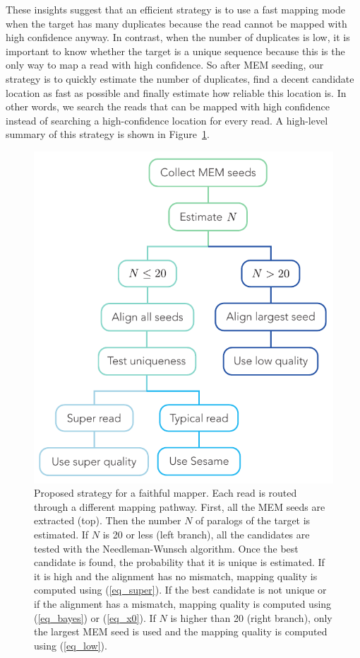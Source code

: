 \documentclass[a4,center,fleqn]{NAR}
\begin{document}
These insights suggest that an efficient strategy is to use a fast mapping
mode when the target has many duplicates because the read cannot be mapped
with high confidence anyway. In contrast, when the number of duplicates is
low, it is important to know whether the target is a unique sequence
because this is the only way to map a read with high confidence. So after
MEM seeding, our strategy is to quickly estimate the number of duplicates,
find a decent candidate location as fast as possible and finally estimate
how reliable this location is. In other words, we search the reads that
can be mapped with high confidence instead of searching a high-confidence
location for every read. A high-level summary of this strategy is shown in
Figure~\ref{fig_tree}.

\begin{figure}[t]
\begin{center}
\includegraphics[scale=.8]{decision_tree.pdf}
\end{center}
\caption{Proposed strategy for a faithful mapper. Each read is routed
through a different mapping pathway. First, all the MEM seeds are
extracted (top). Then the number $N$ of paralogs of the target is
estimated. If $N$ is 20 or less (left branch), all the candidates are
tested with the Needleman-Wunsch algorithm. Once the best candidate is
found, the probability that it is unique is estimated. If it is high and
the alignment has no mismatch, mapping quality is computed using
(\ref{eq_super}). If the best candidate is not unique or if the alignment
has a mismatch, mapping quality is computed using (\ref{eq_bayes}) or
(\ref{eq_x0}). If $N$ is higher than 20 (right branch), only the largest
MEM seed is used and the mapping quality is computed using (\ref{eq_low}).
}
\label{fig_tree}
\end{figure}
\end{document}
